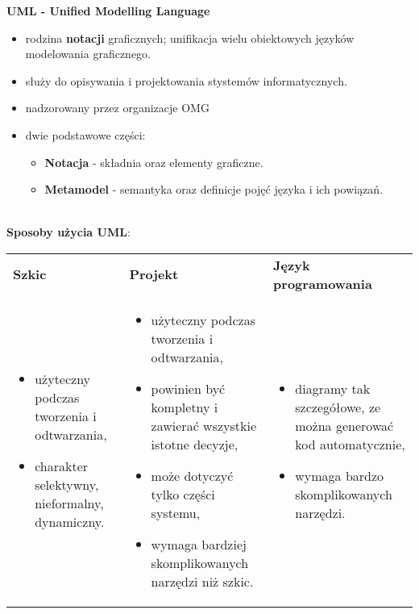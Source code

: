 \documentclass[../main.tex]{subfiles}
\begin{document}
    \textbf{UML - Unified Modelling Language}
    \begin{itemize}
        \item rodzina \textbf{notacji} graficznych; unifikacja wielu obiektowych języków modelowania graficznego.
        \item służy do opisywania i projektowania stystemów informatycznych.
        \item nadzorowany przez organizacje OMG
        \item dwie podstawowe części:
        \begin{itemize}
            \item \textbf{Notacja} - składnia oraz elementy graficzne.
            \item \textbf{Metamodel} - semantyka oraz definicje pojęć języka i ich powiązań.
        \end{itemize}
    \end{itemize}
    \hfill \\
    \textbf{Sposoby użycia UML}:

    \begin{table}[H]
        \begin{center}
            \begin{tabular}{  p{5cm} p{5cm}  p{5cm} }
                \toprule
                \textbf{Szkic} & \textbf{Projekt} & \textbf{Język programowania}\\

                \cmidrule(r){1-1}\cmidrule(rl){2-2}\cmidrule(l){3-3}

                \begin{itemize}
                    \item użyteczny podczas tworzenia i odtwarzania,
                    \item charakter selektywny, nieformalny, dynamiczny.
                \end{itemize}
                &
                \begin{itemize}
                    \item użyteczny podczas tworzenia i odtwarzania,
                    \item powinien być kompletny i zawierać wszystkie istotne decyzje,
                    \item może dotyczyć tylko części systemu,
                    \item wymaga bardziej skomplikowanych narzędzi niż szkic.
                \end{itemize}
                &
                \begin{itemize}
                    \item diagramy tak szczegółowe, ze można generować kod automatycznie,
                    \item wymaga bardzo skomplikowanych narzędzi.
                \end{itemize}
                \\


                \bottomrule
            \end{tabular}
        \end{center}
    \end{table}
\end{document}
